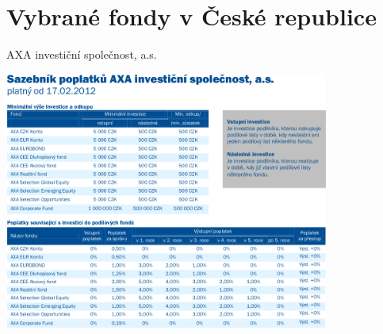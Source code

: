 \documentclass[xcolor=dvipsnames]{beamer}
\begin{document}
	\section{Vybrané fondy v České republice}
		\begin{frame}{AXA investiční společnost, a.s.}
			\begin{center}
				\includegraphics[width=0.8\textwidth]{axa_popl.png}			
			\end{center}
		\end{frame}
\end{document}

